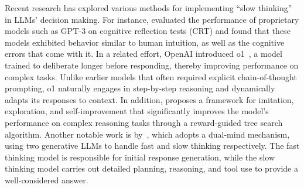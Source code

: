 Recent research has explored various methods for implementing ``slow thinking'' in LLMs' decision making. For instance, \citet{hagendorff2022thinking} evaluated the performance of proprietary models such as GPT-3 on cognitive reflection tests (CRT) and found that these models exhibited behavior similar to human intuition, as well as the cognitive errors that come with it. In a related effort, OpenAI introduced o1~\cite{openai2024learning}, a model trained to deliberate longer before responding, thereby improving performance on complex tasks. Unlike earlier models that often required explicit chain-of-thought prompting, o1 naturally engages in step-by-step reasoning and dynamically adapts its responses to context. In addition, \citet{DBLP:journals/corr/abs-2412-09413} proposes a framework for imitation, exploration, and self-improvement that significantly improves the model's performance on complex reasoning tasks through a reward-guided tree search algorithm. Another notable work is by~\citet{DBLP:journals/corr/abs-2310-18075}, which adopts a dual-mind mechanism, using two generative LLMs to handle fast and slow thinking respectively. The fast thinking model is responsible for initial response generation, while the slow thinking model carries out detailed planning, reasoning, and tool use to provide a well-considered answer.